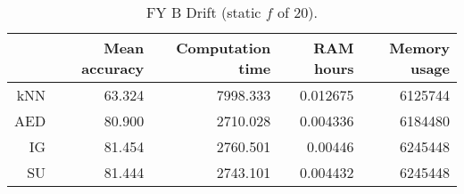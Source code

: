 \begin{table}[h]
\centering
\begin{tabular}{r|rrrr}
    & Mean accuracy & Computation time & RAM hours & Memory usage \\ \hline
kNN & 63.324                   & 7998.333         & 0.012675  & 6125744   \\
AED & 80.900                   & 2710.028         & 0.004336  & 6184480   \\
IG  & 81.454                   & 2760.501         & 0.00446   & 6245448   \\
SU  & 81.444                   & 2743.101         & 0.004432  & 6245448  
\end{tabular}
\caption{FY B Drift (static $f$ of 20).}
\label{Table:FY_B_Drift}
\end{table}